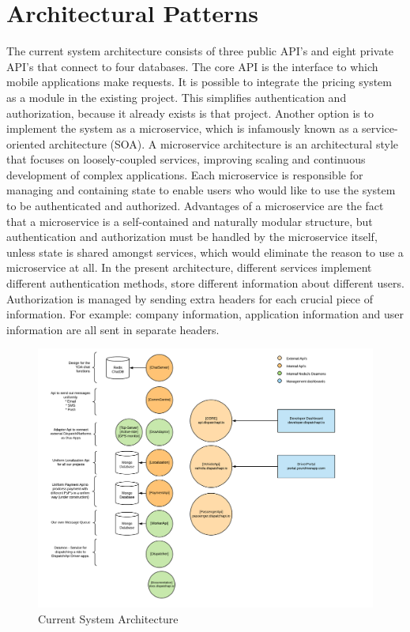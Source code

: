 \section{Architectural Patterns}
The current system architecture consists of three public API's and eight private API's that connect to four databases.  The core API is the interface to which mobile applications make requests. It is possible to integrate the pricing system as a module in the existing project. This simplifies authentication and authorization, because it already exists is that project. Another option is to implement the system as a microservice, which is infamously known as a service-oriented architecture (SOA). A microservice architecture is an architectural style that focuses on loosely-coupled services, improving scaling and continuous development of complex applications. Each microservice is responsible for managing and containing state to enable users who would like to use the system to be authenticated and authorized. Advantages of a microservice are the fact that a microservice is a self-contained and naturally modular structure, but authentication and authorization must be handled by the microservice itself, unless state is shared amongst services, which would eliminate the reason to use a microservice at all. In the present architecture, different services implement different authentication methods, store different information about different users. Authorization is managed by sending extra headers for each crucial piece of information. For example: company information, application information and user information are all sent in separate headers.

\begin{figure}[ht!]
	\centering
	\includegraphics[width=1\textwidth]{Architecture}
	\caption[Architecture]{Current System Architecture}
	\label{fig:Architecture}
\end{figure}
\clearpage

